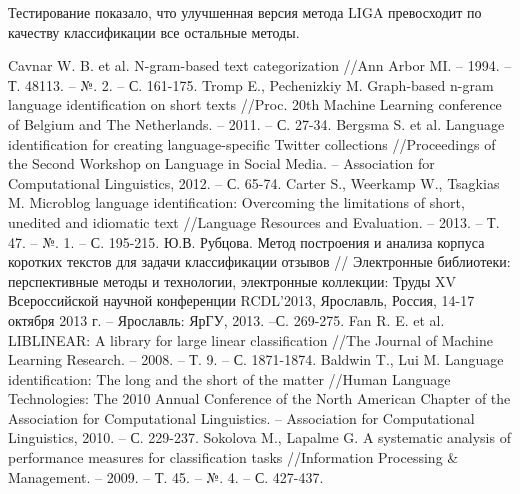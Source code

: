 \documentclass[a4paper, 14pt]{article}
\begin{document}
		Тестирование показало, что улучшенная версия метода LIGA превосходит по качеству классификации все остальные методы.
		


  \begin{thebibliography}{99}
     Cavnar W. B. et al. N-gram-based text categorization //Ann Arbor MI. – 1994. – Т. 48113. – №. 2. – С. 161-175.
     Tromp E., Pechenizkiy M. Graph-based n-gram language identification on short texts //Proc. 20th Machine Learning conference of Belgium and The Netherlands. – 2011. – С. 27-34.
     Bergsma S. et al. Language identification for creating language-specific Twitter collections //Proceedings of the Second Workshop on Language in Social Media. – Association for Computational Linguistics, 2012. – С. 65-74.
     Carter S., Weerkamp W., Tsagkias M. Microblog language identification: Overcoming the limitations of short, unedited and idiomatic text //Language Resources and Evaluation. – 2013. – Т. 47. – №. 1. – С. 195-215.
     Ю.В. Рубцова. Метод построения и анализа корпуса коротких текстов для задачи классификации отзывов // Электронные библиотеки: перспективные методы и технологии, электронные коллекции: Труды XV Всероссийской научной конференции RCDL’2013, Ярославль, Россия, 14-17 октября 2013 г. – Ярославль: ЯрГУ, 2013. –С. 269-275.
     Fan R. E. et al. LIBLINEAR: A library for large linear classification //The Journal of Machine Learning Research. – 2008. – Т. 9. – С. 1871-1874.
     Baldwin T., Lui M. Language identification: The long and the short of the matter //Human Language Technologies: The 2010 Annual Conference of the North American Chapter of the Association for Computational Linguistics. – Association for Computational Linguistics, 2010. – С. 229-237.
     Sokolova M., Lapalme G. A systematic analysis of performance measures for classification tasks //Information Processing \& Management. – 2009. – Т. 45. – №. 4. – С. 427-437.
  \end{thebibliography}
  
 
  \appendix
  \renewcommand{\thesection}{\Asbuk{section}}
  \pagebreak
\end{document}
